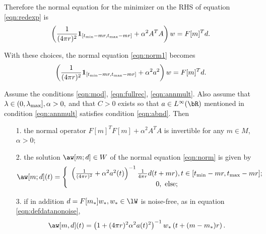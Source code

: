 Therefore the normal equation for the minimizer on the RHS of equation \ref{eqn:redexp} is
\begin{equation}
  \label{eqn:norm1}
  \left(\frac{1}{(4\pi r)^2} {\bf 1}_{[t_{\rm min}-mr,  
      t_{\rm max}-mr]} + \alpha^2 A^TA\right)w= F[m]^Td.
\end{equation}

With these choices, the normal equation \ref{eqn:norm1} becomes
\begin{equation}
\label{eqn:norm2}
\left(\frac{1}{(4\pi r)^2}  {\bf 1}_{[t_{\rm min}-mr,  
      t_{\rm max}-mr]} + \alpha^2a^2\right)w= F[m]^Td.
\end{equation}

\begin{proposition}
  \label{thm:norminvexp}
  Assume the conditions \ref{eqn:mod}, \ref{eqn:fullrec},
  \ref{eqn:annmult}. Also assume that $\lambda \in (0,\lambda_{\rm
    max}], \alpha > 0,$ and that  $C>0$ exists so that $a \in L^{\infty}(\bR)$
  mentioned in condition \ref{eqn:annmult} satisfies condition
  \ref{eqn:abnd}.
  Then
  \begin{itemize}
  \item[1. ]the normal operator $F[m]^TF[m] + \alpha^2A^TA$ is
    invertible for any $m \in M$, $\alpha > 0$;
  \item[2. ]the solution $\aw[m;d]\in W$ of the normal equation
    \ref{eqn:norm} is given by
    \begin{equation}
      \label{eqn:normsol}
      \aw[m;d](t) = \left\{
        \begin{array}{c}
          \left(\frac{1}{(4\pi r)^2} + \alpha^2
          a^2(t)\right)^{-1}\frac{1}{4 \pi r}d(t+mr), t \in [t_{\rm
          min}-mr, t_{\rm max}-mr];\\
          0, \mbox{ else;}
        \end{array}
      \right.
    \end{equation}
  \item[3. ]if in addition $d=F[m_*]w_*, w_* \in \lW$ is noise-free, as in equation
    \ref{eqn:defdatanonoise},
    \begin{equation}
      \label{eqn:solnonoise}
      \aw[m,d](t)= \left(1+ (4\pi r)^2\alpha^2 a(t)^2\right)^{-1}w_*\left(t+(m-m_*)r\right).
    \end{equation}
  \end{itemize}
\end{proposition}

